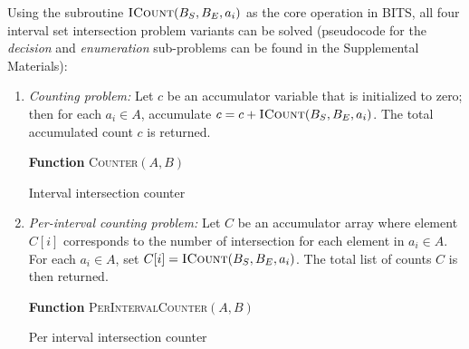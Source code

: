 \documentclass{bioinfo}
\begin{document}
	Using the subroutine $\textsc{ICount}(B_S,B_E,a_i)$ as the core operation
	in BITS, all four interval set intersection problem variants can be 
	solved (pseudocode for the \emph{decision} and \emph{enumeration} sub-problems
	can be found in the Supplemental Materials):

	\begin{enumerate}


		\item
		{\em Counting problem:}  Let $c$ be an accumulator variable that is
		initialized to zero; then for each $a_i \in A$, accumulate $c = c +
		\textsc{ICount}(B_S,B_E,a_i)$.  The total accumulated count $c$ is 
		returned.
		\begin{algorithm}[h]
			\DontPrintSemicolon
			\footnotesize
			\BlankLine
			\textbf{Function} \textsc{Counter}$(A,B)$
			\caption{Interval intersection counter}
		\end{algorithm}
		

		\item
		{\em Per-interval counting problem:} Let $C$ be an accumulator
		array where element $C[i]$ corresponds to the number of
		intersection for each element in $a_i\in A$.  For each $a_i \in A$,
		set $C[i]=\textsc{ICount}(B_S,B_E,a_i)$.  The total list of counts $C$ is then
		returned.
		
		\begin{algorithm}[h]
			\DontPrintSemicolon
			\footnotesize
			\BlankLine
			\textbf{Function} \textsc{PerIntervalCounter}$(A,B)$
			\caption{Per interval intersection counter}
		\end{algorithm}


\end{enumerate}
\end{document}
